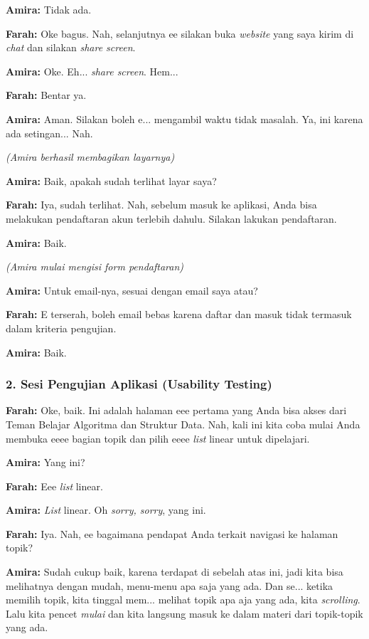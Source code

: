 \textbf{Amira:} Tidak ada.

\textbf{Farah:} Oke bagus. Nah, selanjutnya ee silakan buka \textit{website} yang saya kirim di \textit{chat} dan silakan \textit{share screen}.

\textbf{Amira:} Oke. Eh... \textit{share screen}. Hem...

\textbf{Farah:} Bentar ya.

\textbf{Amira:} Aman. Silakan boleh e... mengambil waktu tidak masalah. Ya, ini karena ada setingan... Nah.

\textit{(Amira berhasil membagikan layarnya)}

\textbf{Amira:} Baik, apakah sudah terlihat layar saya?

\textbf{Farah:} Iya, sudah terlihat. Nah, sebelum masuk ke aplikasi, Anda bisa melakukan pendaftaran akun terlebih dahulu. Silakan lakukan pendaftaran.

\textbf{Amira:} Baik.

\textit{(Amira mulai mengisi form pendaftaran)}

\textbf{Amira:} Untuk email-nya, sesuai dengan email saya atau?

\textbf{Farah:} E terserah, boleh email bebas karena daftar dan masuk tidak termasuk dalam kriteria pengujian.

\textbf{Amira:} Baik.

\bigskip

\subsubsection*{2. Sesi Pengujian Aplikasi (Usability Testing)}

\textbf{Farah:} Oke, baik. Ini adalah halaman eee pertama yang Anda bisa akses dari Teman Belajar Algoritma dan Struktur Data. Nah, kali ini kita coba mulai Anda membuka eeee bagian topik dan pilih eeee \textit{list} linear untuk dipelajari.

\textbf{Amira:} Yang ini?

\textbf{Farah:} Eee \textit{list} linear.

\textbf{Amira:} \textit{List} linear. Oh \textit{sorry, sorry}, yang ini.

\textbf{Farah:} Iya. Nah, ee bagaimana pendapat Anda terkait navigasi ke halaman topik?

\textbf{Amira:} Sudah cukup baik, karena terdapat di sebelah atas ini, jadi kita bisa melihatnya dengan mudah, menu-menu apa saja yang ada. Dan se... ketika memilih topik, kita tinggal mem... melihat topik apa aja yang ada, kita \textit{scrolling}. Lalu kita pencet \textit{mulai} dan kita langsung masuk ke dalam materi dari topik-topik yang ada.

